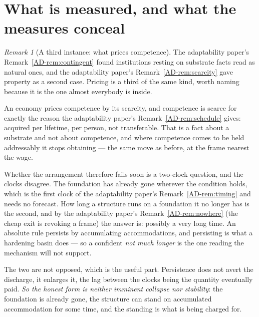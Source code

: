 \documentclass[11pt,a4paper]{article}
\theoremstyle{remark}
\newtheorem{remark}[definition]{Remark}
\begin{document}
\section{What is measured, and what the measures conceal}\label{sec:measures}
\begin{remark}[A third instance: what prices competence]\label{rem:pricing}
The adaptability paper's Remark~\ref{AD-rem:contingent} found institutions resting on substrate facts read as natural ones, and
the adaptability paper's Remark~\ref{AD-rem:scarcity} gave property as a second case. Pricing is a third of the same kind,
worth naming because it is the one almost everybody is inside.

An economy prices competence by its scarcity, and competence is scarce for exactly the reason
the adaptability paper's Remark~\ref{AD-rem:schedule} gives: acquired per lifetime, per person, not transferable. That is a
fact about a substrate and not about competence, and where competence comes to be held addressably it
stops obtaining --- the same move as before, at the frame nearest the wage.

Whether the arrangement therefore fails soon is a two-clock question, and the clocks disagree. The
foundation has already gone wherever the condition holds, which is the first clock of the adaptability paper's Remark~\ref{AD-rem:timing}
and needs no forecast. How long a structure runs on a foundation it no longer has is the second, and by
the adaptability paper's Remark~\ref{AD-rem:nowhere} (the cheap exit is revoking a frame) the answer
is: possibly a very long time. An absolute rule persists by
accumulating accommodations, and persisting is what a hardening basin does --- so a confident \emph{not
much longer} is the one reading the mechanism will not support.

The two are not opposed, which is the useful part. Persistence does not avert the discharge, it
enlarges it, the lag between the clocks being the quantity eventually paid. \emph{So the honest form is
neither imminent collapse nor stability}: the foundation is already gone, the structure can stand on
accumulated accommodation for some time, and the standing is what is being charged for.
\end{remark}
\end{document}
